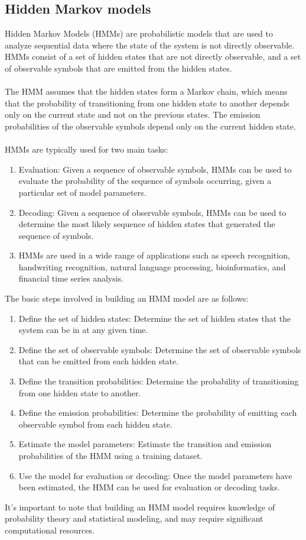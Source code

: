\subsection{Hidden Markov models}
Hidden Markov Models (HMMs) are probabilistic models that are used to analyze sequential data where the state of the
system is not directly observable. HMMs consist of a set of hidden states that are not directly observable, and a
set of observable symbols that are emitted from the hidden states.\\
\\
The HMM assumes that the hidden states form a Markov chain, which means that the probability of transitioning from
one hidden state to another depends only on the current state and not on the previous states. The emission
probabilities of the observable symbols depend only on the current hidden state.\\
\\
HMMs are typically used for two main tasks:
\begin{enumerate}
    \item Evaluation: Given a sequence of observable symbols, HMMs can be used to evaluate the probability of the
    sequence of symbols occurring, given a particular set of model parameters.
    \item Decoding: Given a sequence of observable symbols, HMMs can be used to determine the most likely
    sequence of hidden states that generated the sequence of symbols.
    \item HMMs are used in a wide range of applications such as speech recognition, handwriting recognition, natural
    language processing, bioinformatics, and financial time series analysis.
\end{enumerate}
The basic steps involved in building an HMM model are as follows:
\begin{enumerate}
    \item Define the set of hidden states: Determine the set of hidden states that the system can be in at any given time.
    \item Define the set of observable symbols: Determine the set of observable symbols that can be emitted from each hidden state.
    \item Define the transition probabilities: Determine the probability of transitioning from one hidden state to another.
    \item Define the emission probabilities: Determine the probability of emitting each observable symbol from each hidden state.
    \item Estimate the model parameters: Estimate the transition and emission probabilities of the HMM using a training dataset.
    \item Use the model for evaluation or decoding: Once the model parameters have been estimated, the HMM
    can be used for evaluation or decoding tasks.
\end{enumerate}
It's important to note that building an HMM model requires knowledge of probability theory and statistical
modeling, and may require significant computational resources.

